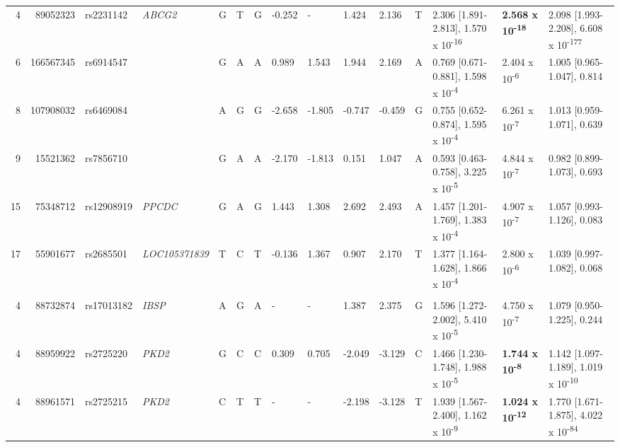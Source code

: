 \documentclass[]{report}
\begin{document}
\begin{landscape}
\begin{table}
{\begin{tabular}[t]{rrlllllllllllll}
\hspace{1em}4 & 89052323 & rs2231142 & \em{ABCG2} & G & T & G & -0.252 & - & 1.424 & 2.136 & T & 2.306 [1.891-2.813], 1.570 x 10\textsuperscript{-16} & \textbf{2.568 x 10\textsuperscript{-18}} & 2.098 [1.993-2.208], 6.608 x 10\textsuperscript{-177}\\
\hspace{1em}6 & 166567345 & rs6914547 & \em{} & G & A & A & 0.989 & 1.543 & 1.944 & 2.169 & A & 0.769 [0.671-0.881], 1.598 x 10\textsuperscript{-4} & 2.404 x 10\textsuperscript{-6} & 1.005 [0.965-1.047], 0.814\\
\hspace{1em}8 & 107908032 & rs6469084 & \em{} & A & G & G & -2.658 & -1.805 & -0.747 & -0.459 & G & 0.755 [0.652-0.874], 1.595 x 10\textsuperscript{-4} & 6.261 x 10\textsuperscript{-7} & 1.013 [0.959-1.071], 0.639\\
\hspace{1em}9 & 15521362 & rs7856710 & \em{} & G & A & A & -2.170 & -1.813 & 0.151 & 1.047 & A & 0.593 [0.463-0.758], 3.225 x 10\textsuperscript{-5} & 4.844 x 10\textsuperscript{-7} & 0.982 [0.899-1.073], 0.693\\
\hspace{1em}15 & 75348712 & rs12908919 & \em{PPCDC} & G & A & G & 1.443 & 1.308 & 2.692 & 2.493 & A & 1.457 [1.201-1.769], 1.383 x 10\textsuperscript{-4} & 4.907 x 10\textsuperscript{-7} & 1.057 [0.993-1.126], 0.083\\
\hspace{1em}17 & 55901677 & rs2685501 & \em{LOC105371839} & T & C & T & -0.136 & 1.367 & 0.907 & 2.170 & T & 1.377 [1.164-1.628], 1.866 x 10\textsuperscript{-4} & 2.800 x 10\textsuperscript{-6} & 1.039 [0.997-1.082], 0.068\\
\addlinespace[0.3em]
\multicolumn{15}{l}{\textbf{nSL}}\\
\hspace{1em}4 & 88732874 & rs17013182 & \em{IBSP} & A & G & A & - & - & 1.387 & 2.375 & G & 1.596 [1.272-2.002], 5.410 x 10\textsuperscript{-5} & 4.750 x 10\textsuperscript{-7} & 1.079 [0.950-1.225], 0.244\\
\hspace{1em}4 & 88959922 & rs2725220 & \em{PKD2} & G & C & C & 0.309 & 0.705 & -2.049 & -3.129 & C & 1.466 [1.230-1.748], 1.988 x 10\textsuperscript{-5} & \textbf{1.744 x 10\textsuperscript{-8}} & 1.142 [1.097-1.189], 1.019 x 10\textsuperscript{-10}\\
\hspace{1em}4 & 88961571 & rs2725215 & \em{PKD2} & C & T & T & - & - & -2.198 & -3.128 & T & 1.939 [1.567-2.400], 1.162 x 10\textsuperscript{-9} & \textbf{1.024 x 10\textsuperscript{-12}} & 1.770 [1.671-1.875], 4.022 x 10\textsuperscript{-84}\\

\end{tabular}}
\end{table}
\end{landscape}
\end{document}
